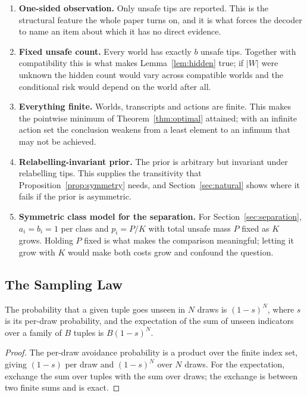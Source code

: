 \begin{enumerate}
\item[1)] \textbf{One-sided observation.} Only unsafe tips are reported. This is the
structural feature the whole paper turns on, and it is what forces the decoder to name an item
about which it has no direct evidence.

\item[2)] \textbf{Fixed unsafe count.} Every world has exactly $b$ unsafe tips. Together with
compatibility this is what makes Lemma~\ref{lem:hidden} true; if $|W|$ were unknown the hidden
count would vary across compatible worlds and the conditional risk would depend on the world
after all.

\item[3)] \textbf{Everything finite.} Worlds, transcripts and actions are finite. This makes
the pointwise minimum of Theorem~\ref{thm:optimal} attained; with an infinite action set the
conclusion weakens from a least element to an infimum that may not be achieved.

\item[4)] \textbf{Relabelling-invariant prior.} The prior is arbitrary but invariant under
relabelling tips. This supplies the transitivity that Proposition~\ref{prop:symmetry} needs,
and Section~\ref{sec:natural} shows where it fails if the prior is asymmetric.

\item[5)] \textbf{Symmetric class model for the separation.} For
Section~\ref{sec:separation}, $a_{i}=b_{i}=1$ per class and $p_{i}=P/K$ with total unsafe mass
$P$ fixed as $K$ grows. Holding $P$ fixed is what makes the comparison meaningful; letting it
grow with $K$ would make both costs grow and confound the question.
\end{enumerate}

\subsection{The Sampling Law}
\label{sec:sampling}

\begin{theorem}
\label{thm:sampling}
The probability that a given tuple goes unseen in $N$ draws is $(1-s)^{N}$, where $s$ is its
per-draw probability, and the expectation of the sum of unseen indicators over a family of $B$
tuples is $B(1-s)^{N}$.
\end{theorem}

\begin{proof}
The per-draw avoidance probability is a product over the finite index set, giving $(1-s)$ per
draw and $(1-s)^{N}$ over $N$ draws. For the expectation, exchange the sum over tuples with
the sum over draws; the exchange is between two finite sums and is exact.
\end{proof}


